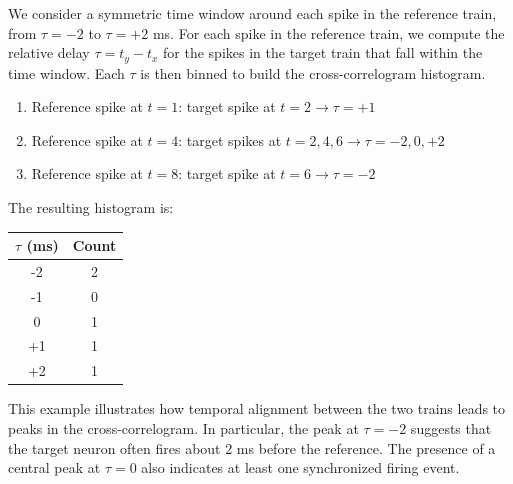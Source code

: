 We consider a symmetric time window around each spike in the reference train, from \(\tau = -2\) to \(\tau = +2\) ms. For each spike in the reference train, we compute the relative delay \(\tau = t_y - t_x\) for the spikes in the target train that fall within the time window. Each \(\tau\) is then binned to build the cross-correlogram histogram.

\begin{enumerate}
	\item Reference spike at \(t = 1\): target spike at \(t = 2 \rightarrow \tau = +1\)
	\item Reference spike at \(t = 4\): target spikes at \(t = 2, 4, 6 \rightarrow \tau = -2, 0, +2\)
	\item Reference spike at \(t = 8\): target spike at \(t = 6 \rightarrow \tau = -2\)
\end{enumerate}

\noindent
The resulting histogram is:

\begin{center}
	\begin{tabular}{c|c}
		\(\tau\) (ms) & Count \\
		\hline
		-2 & 2 \\
		-1 & 0 \\
		0  & 1 \\
		+1 & 1 \\
		+2 & 1 \\
	\end{tabular}
\end{center}

\noindent
This example illustrates how temporal alignment between the two trains leads to peaks in the cross-correlogram. In particular, the peak at \(\tau = -2\) suggests that the target neuron often fires about 2 ms before the reference. The presence of a central peak at \(\tau = 0\) also indicates at least one synchronized firing event.



